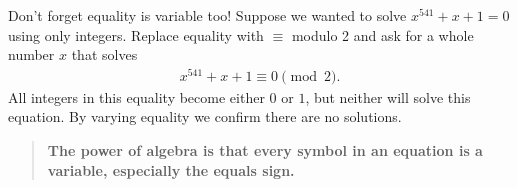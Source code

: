 Don't forget equality is variable too!  Suppose we wanted to solve $x^{541}+x+1=0$
using only integers.  Replace equality 
with $\equiv$ modulo 2 and ask for a whole number $x$ that solves
\begin{align*}
    x^{541}+x+1\equiv 0\pmod{2}.
\end{align*}
All integers in this equality become either $0$ or $1$, but neither will solve 
this equation.  By varying equality we confirm there are no solutions.


\begin{quote}
    \textbf{The power of algebra is that every symbol 
    in an equation is a variable, especially the equals sign.}
\end{quote}
